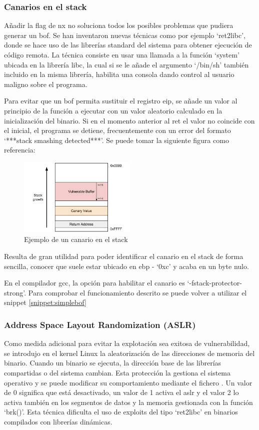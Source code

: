 \subsubsection{Canarios en el stack}
Añadir la flag de \acrshort{nx} no soluciona todos los posibles problemas que pudiera generar un \acrshort{bof}.
Se han inventaron nuevas técnicas como por ejemplo `ret2libc', donde se hace uso de las librerías standard del sistema para obtener ejecución de código remota.
La técnica consiste en usar una llamada a la función `system' ubicada en la librería \acrshort{libc}, la cual si se le añade el argumento `/bin/sh' también incluido en la misma librería, habilita una consola dando control al usuario maligno sobre el programa.

Para evitar que un \acrshort{bof} permita sustituir el registro \acrshort{eip}, se añade un valor al principio de la función a ejecutar con un valor aleatorio calculado en la inicialización del binario.
Si en el momento anterior al \acrfull{ret} el valor no coincide con el inicial, el programa se detiene, frecuentemente con un error del formato `***stack smashing detected***'.
Se puede tomar la siguiente figura como referencia:
\FloatBarrier
\begin{figure}
    \centering                        
    \includegraphics[width=0.5\textwidth]{images/stack-canary.png}
    \caption{Ejemplo de un canario en el stack}
    \label{fig:stack-canary}
\end{figure}
\FloatBarrier
Resulta de gran utilidad para poder identificar el canario en el stack de forma sencilla, conocer que suele estar ubicado en \acrshort{ebp} - `0xc' y acaba en un byte nulo.

\FloatBarrier
En el compilador \acrshort{gcc}, la opción para habilitar el canario es `-fstack-protector-strong'.
Para comprobar el funcionamiento descrito se puede volver a utilizar el snippet \ref{snippet:simplebof}
\subsubsection{Address Space Layout Randomization (ASLR)}
Como medida adicional para evitar la explotación sea exitosa de vulnerabilidad, se introdujo en el kernel Linux la aleatorización de las direcciones de memoria del binario.
Cuando un binario se ejecuta, la dirección base de las librerías compartidas o del sistema cambian.
Esta protección la gestiona el sistema operativo y se puede modificar su comportamiento mediante el fichero .
Un valor de 0 significa que está desactivado, un valor de 1 activa el \acrshort{aslr} y el valor 2 lo activa también en los segmentos de datos y la memoria gestionada con la función `brk()'.
Esta técnica dificulta el uso de exploits del tipo `ret2libc' en binarios compilados con librerías dinámicas.
